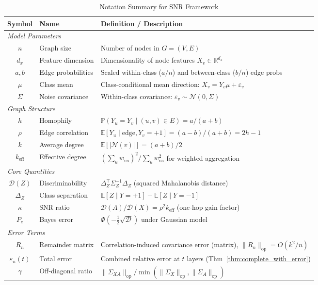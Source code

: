 \begin{table}[t]
\centering
\caption{Notation Summary for SNR Framework}
\label{tab:notation_summary}
\small
\begin{tabular}{@{}clp{7cm}@{}}
\toprule
\textbf{Symbol} & \textbf{Name} & \textbf{Definition / Description} \\
\midrule
\multicolumn{3}{l}{\textit{Model Parameters}} \\
$n$ & Graph size & Number of nodes in $G = (V, E)$ \\
$d_x$ & Feature dimension & Dimensionality of node features $X_v \in \mathbb{R}^{d_x}$ \\
$a, b$ & Edge probabilities & Scaled within-class ($a/n$) and between-class ($b/n$) edge probs \\
$\mu$ & Class mean & Class-conditional mean direction: $X_v = Y_v \mu + \varepsilon_v$ \\
$\Sigma$ & Noise covariance & Within-class covariance: $\varepsilon_v \sim \mathcal{N}(0, \Sigma)$ \\
\midrule
\multicolumn{3}{l}{\textit{Graph Structure}} \\
$h$ & Homophily & $\mathbb{P}(Y_u = Y_v \mid (u,v) \in E) = a/(a+b)$ \\
$\rho$ & Edge correlation & $\mathbb{E}[Y_u \mid \text{edge}, Y_v = +1] = (a-b)/(a+b) = 2h-1$ \\
$k$ & Average degree & $\mathbb{E}[|\mathcal{N}(v)|] = (a+b)/2$ \\
$k_{\mathrm{eff}}$ & Effective degree & $({\textstyle\sum_u} w_{vu})^2 / {\textstyle\sum_u} w_{vu}^2$ for weighted aggregation \\
\midrule
\multicolumn{3}{l}{\textit{Core Quantities}} \\
$\mathcal{D}(Z)$ & Discriminability & $\Delta_Z^\top \Sigma_Z^{-1} \Delta_Z$ (squared Mahalanobis distance) \\
$\Delta_Z$ & Class separation & $\mathbb{E}[Z \mid Y=+1] - \mathbb{E}[Z \mid Y=-1]$ \\
$\kappa$ & SNR ratio & $\mathcal{D}(A) / \mathcal{D}(X) = \rho^2 k_{\mathrm{eff}}$ (one-hop gain factor) \\
$P_e$ & Bayes error & $\Phi(-\frac{1}{2}\sqrt{\mathcal{D}})$ under Gaussian model \\
\midrule
\multicolumn{3}{l}{\textit{Error Terms}} \\
$R_n$ & Remainder matrix & Correlation-induced covariance error (matrix), $\|R_n\|_{\mathrm{op}} = O(k^2/n)$ \\
$\varepsilon_n(t)$ & Total error & Combined relative error at $t$ layers (Thm~\ref{thm:complete_with_error}) \\
$\gamma$ & Off-diagonal ratio & $\|\Sigma_{XA}\|_{\mathrm{op}} / \min(\|\Sigma_X\|_{\mathrm{op}}, \|\Sigma_A\|_{\mathrm{op}})$ \\
\bottomrule
\end{tabular}
\end{table}


